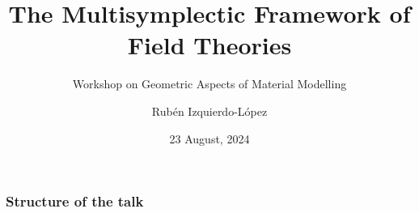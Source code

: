 \documentclass[10 pt,
handout
]{beamer}
\title{The Multisymplectic Framework of Field Theories}
\subtitle{Workshop on Geometric Aspects of Material Modelling}
\author{Rubén Izquierdo-López}
\institute{ICMAT-UCM}
\date{23 August, 2024}
\theoremstyle{plain} %
\theoremstyle{definition} %
\begin{document}
    \begin{frame}[plain]
        \titlepage
    \end{frame}
    
    \begin{frame}
        \frametitle{Structure of the talk}
       \tableofcontents
    \end{frame}
    
    

    

    
\end{document}
